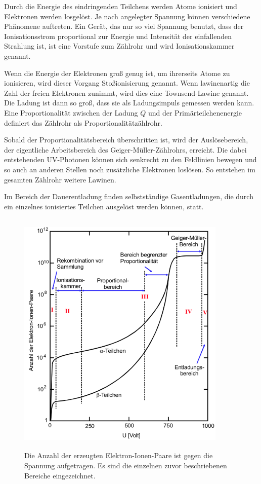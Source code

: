 \noindent Durch die Energie des eindringenden Teilchens werden Atome ionisiert und Elektronen werden losgelöst. Je nach angelegter Spannung können verschiedene Phänomene auftreten. Ein Gerät, das nur so viel Spannung benutzt, dass der Ionisationsstrom proportional zur Energie und Intensität der einfallenden Strahlung ist, ist eine Vorstufe zum Zählrohr und wird Ionisationskammer genannt. 

\noindent Wenn die Energie der Elektronen groß genug ist, um ihrerseits Atome zu ionisieren, wird dieser Vorgang Stoßionisierung genannt. Wenn lawinenartig die Zahl der freien Elektronen zunimmt, wird dies eine Townsend-Lawine genannt. 
Die Ladung ist dann so groß, dass sie als Ladungsimpuls gemessen werden kann.
Eine Proportionalität zwischen der Ladung $Q$ und der Primärteilchenenergie definiert das Zählrohr als Proportionalitätzählrohr. 

\noindent Sobald der Proportionalitätsbereich überschritten ist, wird der Auslösebereich, der eigentliche Arbeitsbereich des Geiger-Müller-Zählrohrs, erreicht. Die dabei entstehenden UV-Photonen können sich senkrecht zu den Feldlinien bewegen und so auch an anderen Stellen noch zusätzliche Elektronen loslösen. So entstehen im gesamten Zählrohr weitere Lawinen. 

\noindent Im Bereich der Dauerentladung finden selbstständige Gasentladungen, die durch ein einzelnes ionisiertes Teilchen ausgelöst werden können, statt.

\begin{figure}
    \centering
    \includegraphics[width=10cm, height=12cm]{build/anzahl_spannung.png}
    \caption{Die Anzahl der erzeugten Elektron-Ionen-Paare ist gegen die Spannung aufgetragen. Es sind die einzelnen zuvor beschriebenen Bereiche eingezeichnet.}
    \label{fig:anzahl_spannung}
\end{figure}

